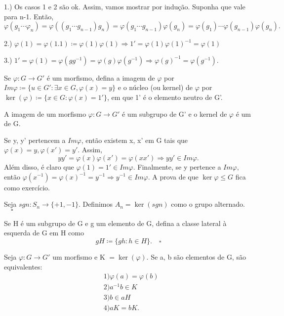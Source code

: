 \documentclass[algebra_notes.tex]{subfiles}
\begin{document}
\begin{proof*}
	1.) Os casos 1 e 2 são ok. Assim, vamos mostrar por indução. Suponha que vale para
	n-1. Então,
	$$
		\varphi(g_{1}\cdots\varphi_{n})=\varphi((g_{1}\cdots g_{n-1})g_{n}) = \varphi(g_{1}\cdots g_{n-1})\varphi(g_{n}) = \varphi(g_{1})\cdots\varphi(g_{n-1})\varphi(g_{n}).
	$$

	2.) $\varphi(1) = \varphi(1.1)\coloneqq \varphi(1)\varphi(1) \Rightarrow 1' = \varphi(1)\varphi(1)^{-1} = \varphi(1)$

	3.) $1' = \varphi(1) = \varphi(gg^{-1}) = \varphi(g)\varphi(g^{-1}) \Rightarrow \varphi(g)^{-1} = \varphi(g^{-1}).$ \qedsymbol
\end{proof*}
\begin{def*}
	Se $\varphi:G\rightarrow G'$ é um morfismo, defina a imagem de $\varphi$ por $Im \varphi\coloneqq\{u\in G': \exists x\in G, \varphi(x)=y\}$
	e o núcleo (ou kernel) de $\varphi$ por $\ker{(\varphi)}\coloneqq\{x\in G: \varphi(x) = 1'\} $, em que 1' é o elemento neutro de G'.
\end{def*}
\begin{prop*}
	A imagem de um morfismo $\varphi:G\rightarrow G'$ é um subgrupo de G' e o kernel de $\varphi$ é um de G.
\end{prop*}
\begin{proof*}
	Se y, y' pertencem a $Im\varphi$, então existem x, x' em G tais que $\varphi(x) = y, \varphi(x')=y'.$ Assim,
	$$
		yy' = \varphi(x)\varphi(x') = \varphi(xx') \Rightarrow yy'\in Im\varphi.
	$$
	Além disso, é claro que $\varphi(1) = 1'\in Im\varphi.$ Finalmente, se y pertence a $Im \varphi,$ então
	$\varphi(x^{-1}) = \varphi(x)^{-1} = y^{-1} \Rightarrow y^{-1}\in Im \varphi.$ A prova de que $\ker\varphi\leq{G}$ fica como
	exercício. \qedsymbol
\end{proof*}
\begin{def*}
	Seja $sgn:S_{n}\rightarrow \{+1, -1\}$. Definimos $A_{n} = \ker{(sgn)}$ como o grupo alternado. $\quad\square$
\end{def*}
\begin{def*}
	Se H é um subgrupo de G e g um elemento de G, defina a classe lateral \`a esquerda de G em H como
	$$
		gH\coloneqq \{gh: h\in H\}.\quad\square
	$$
\end{def*}
\begin{prop*}
	Seja $\varphi:G\rightarrow G'$ um morfismo e K $= \ker{(\varphi)}.$ Se a, b são elementos de G, são equivalentes:
	\begin{align*}
		 & 1) \varphi(a) = \varphi(b) \\
		 & 2) a^{-1}b\in K            \\
		 & 3) b\in aH                 \\
		 & 4) aK = bK.
	\end{align*}
\end{prop*}
\end{document}
